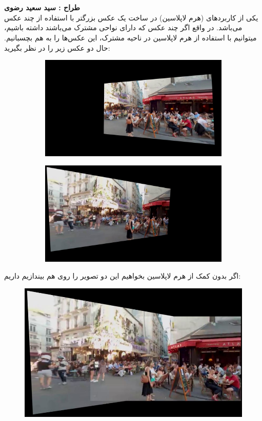 \documentclass[a4paper]{article}
\begin{document}
\section{}
\textbf{طراح :‌ سید سعید رضوی}
\vspace{0.5cm}
\\
یکی از کاربرد‌های
(هرم لاپلاسین) در ساخت یک عکس بزرگتر با استفاده از چند عکس می‌باشد. در واقع اگر چند عکس که دارای نواحی مشترک می‌باشند داشته باشیم، میتوانیم با استفاده از هرم لاپلاسین در ناحیه مشترک، این عکس‌ها را به هم بچسبانیم. حال دو عکس زیر را در نظر بگیرید:
\begin{figure}[H]
	\centering
	\begin{subfigure}{.5\textwidth}
		\centering
		\includegraphics[width=.9\linewidth]{q2_1}
	\end{subfigure}%
	\begin{subfigure}{.5\textwidth}
		\centering
		\includegraphics[width=.9\linewidth]{q2_0}
	\end{subfigure}
	\caption{}
\end{figure}
اگر بدون کمک از هرم لاپلاسین بخواهیم این دو تصویر را روی هم بیندازیم داریم: 
	\begin{figure}[H]
		\centering
		\includegraphics[width=0.6 \linewidth]{q2_2}
		\caption{
		}
		
	\end{figure}
\end{document}
